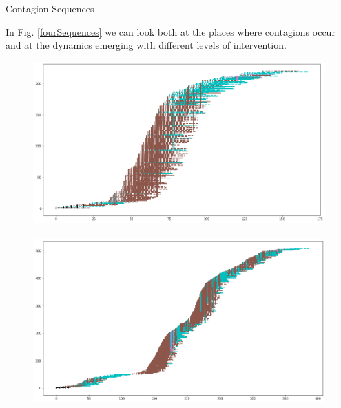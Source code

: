 \documentclass[8pt]{beamer}
\begin{document}
\begin{frame}{Contagion Sequences}

In Fig. \ref{fourSequences} we can look both at the places where contagions occur and at the dynamics emerging with different levels of intervention. 

\begin{figure}[H]
\center
\includegraphics[scale=0.105]{withShort1.png}~~~~~~~~~~~\includegraphics[scale=0.105]{withShort1A.png} 


\end{figure}
\end{frame}
\end{document}
